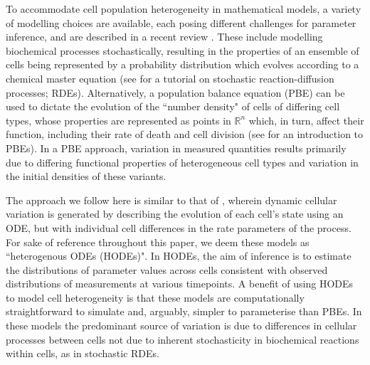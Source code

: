 \documentclass[10pt,letterpaper]{article}
\begin{document}
To accommodate cell population heterogeneity in mathematical models, a variety of modelling choices are available, each posing different challenges for parameter inference, and are described in a recent review \cite{waldherr2018estimation}. These include modelling biochemical processes stochastically, resulting in the properties of an ensemble of cells being represented by a probability distribution which evolves according to a chemical master equation (see \cite{erban2007practical} for a tutorial on stochastic reaction-diffusion processes; RDEs). Alternatively, a population balance equation (PBE) can be used to dictate the evolution of the ``number density" of cells of differing cell types, whose properties are represented as points in $\mathbb{R}^n$ which, in turn, affect their function, including their rate of death and cell division (see \cite{ramkrishna2014population} for an introduction to PBEs). In a PBE approach, variation in measured quantities results primarily due to differing functional properties of heterogeneous cell types and variation in the initial densities of these variants. 

The approach we follow here is similar to that of \cite{dixit2018maximum}, wherein dynamic cellular variation is generated by describing the evolution of each cell's state using an ODE, but with individual cell differences in the rate parameters of the process. For sake of reference throughout this paper, we deem these models as ``heterogenous ODEs (HODEs)". In HODEs, the aim of inference is to estimate the distributions of parameter values across cells consistent with observed distributions of measurements at various timepoints. A benefit of using HODEs to model cell heterogeneity is that these models are computationally straightforward to simulate and, arguably, simpler to parameterise than PBEs. In these models the predominant source of variation is due to differences in cellular processes between cells not due to inherent stochasticity in biochemical reactions within cells, as in stochastic RDEs.
\end{document}
